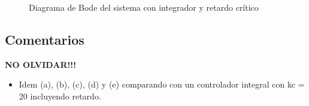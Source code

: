 \begin{figure}[h]
  \centering
  
  \caption{Diagrama de Bode del sistema con integrador y retardo crítico}
  \label{fig:bode-f3}
\end{figure}

\FloatBarrier
\subsection{Comentarios}

\textbf{NO OLVIDAR!!!}

\begin{itemize}
  \item Idem (a), (b), (c), (d) y (e) comparando con un controlador integral con kc = 20 incluyendo retardo.
\end{itemize}
